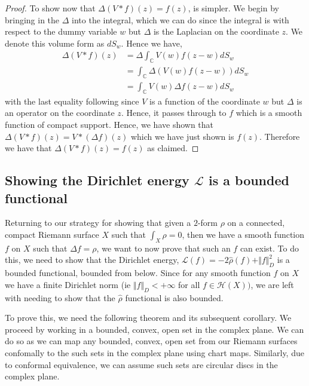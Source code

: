 \documentclass[11pt]{report}
\theoremstyle{definition}
\begin{document}
\begin{proof}
  To show now that $\Delta(V*f)(z) = f(z)$, is simpler. We begin by bringing in the $\Delta$ into the integral, which we can do since the integral is with respect to the dummy variable $w$ but $\Delta$ is the Laplacian on the coordinate $z$. We denote this volume form as $dS_w$. Hence we have,
  \begin{align*}
    \Delta(V*f)(z) &= \Delta \int_\mathbb{C} V(w)f(z-w)dS_w \\
    &= \int_\mathbb{C} \Delta \left(V(w)f(z-w)\right)dS_w \\
    &= \int_\mathbb{C} V(w)\Delta f(z-w)dS_w
  \end{align*}
  with the last equality following since $V$ is a function of the coordinate $w$ but $\Delta$ is an operator on the coordinate $z$. Hence, it passes through to $f$ which is a smooth function of compact support. Hence, we have shown that $\Delta(V*f)(z) = V*(\Delta f)(z)$ which we have just shown is $f(z)$. Therefore we have that $\Delta(V*f)(z) = f(z)$ as claimed.
\end{proof} 

\subsection{Showing the Dirichlet energy $\mathcal{L}$ is a bounded functional}

Returning to our strategy for showing that given a $2$-form $\rho$ on a connected, compact Riemann surface $X$ such that $\int_X \rho = 0$, then we have a smooth function $f$ on $X$ such that $\Delta f = \rho$, we want to now prove that such an $f$ can exist. To do this, we need to show that the Dirichlet energy, $\mathcal{L}(f) = -2\hat{\rho}(f) + \Vert f \Vert^2_D$ is a bounded functional, bounded from below. Since for any smooth function $f$ on $X$ we have a finite Dirichlet norm (ie $\Vert f \Vert_D < +\infty $ for all $f \in \mathcal{H}(X))$, %
we are left with needing to show that the $\hat{\rho}$ functional is also bounded.

To prove this, we need the following theorem and its subsequent corollary. We proceed by working in a bounded, convex, open set in the complex plane. We can do so as we can map any bounded, convex, open set from our Riemann surfaces confomally to the such sets in the complex plane using chart maps. Similarly, due to conformal equivalence, we can assume such sets are circular discs in the complex plane.
\end{document}
